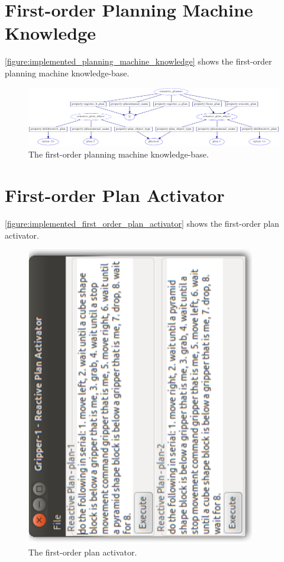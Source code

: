 \section{First-order Planning Machine Knowledge}

{\mbox{\autoref{figure:implemented_planning_machine_knowledge}}} shows
the first-order planning machine knowledge-base.
\begin{figure}
\begin{center}
\includegraphics[width=14cm]{gfx/implemented_planning_machine_knowledge}
\end{center}
\caption[The first-order planning machine knowledge-base.]{The
  first-order planning machine knowledge-base.}
\label{figure:implemented_first_order_planning_machine_knowledge}
\end{figure}

\section{First-order Plan Activator}

{\mbox{\autoref{figure:implemented_first_order_plan_activator}}} shows
the first-order plan activator.
\begin{figure}
\begin{center}
\includegraphics[width=10cm]{gfx/implemented_first_order_plan_activator}
\end{center}
\caption[The first-order plan activator.]{The first-order plan
  activator.}
\label{figure:implemented_first_order_plan_activator}
\end{figure}

